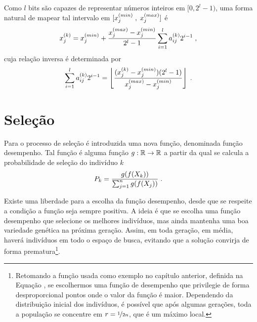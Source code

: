 Como $l$ bits são capazes de representar números inteiros em $ [0, 2^l - 1) $,
uma forma natural de mapear tal intervalo
em $ [ x^{(min)}_{j} \; , \; x^{(max)}_{j} ] $ é
\begin{equation}
  x^{(k)}_j = x^{(min)}_{j} + \frac{x^{(max)}_{j} - x^{(min)}_{j}}{2^l - 1} \sum_{i = 1}^l {a}^{(k)}_{ij} 2^{i - 1} \;\mathrm{,}
\end{equation}
cuja relação inversa é determinada por
\begin{equation}
  \sum_{i = 1}^l {a}^{(k)}_{ij} 2^{i - 1} =
  \left\lfloor \frac{({x}^{(k)}_{j} - x^{(min)}_{j})(2^l - 1)}{x^{(max)}_{j} - x^{(min)}_{j}} \right\rfloor
  \;\mathrm{.}
\end{equation}

\section{Seleção}

Para o processo de seleção é introduzida uma nova função, denominada função desempenho.
Tal função é alguma função $ g : \mathbb{R} \rightarrow \mathbb{R} $ a partir da qual se calcula a probabilidade
de seleção do indivíduo $k$
\begin{equation}
  P_k = \frac{g(f(X_k))}{\sum_{j = 1}^n g(f(X_j))} \;\mathrm{.}
\end{equation}

Existe uma liberdade para a escolha da função desempenho, desde que se respeite a condição a
função seja sempre positiva. A ideia é que se escolha uma função desempenho que
selecione os melhores indivíduos, mas ainda mantenha uma boa variedade genética na
próxima geração. Assim, em toda geração, em média, haverá indivíduos em todo o espaço
de busca, evitando que a solução convirja de forma prematura\footnote{
  Retomando a função usada como exemplo no capítulo anterior, definida na Equação
  , se escolhermos uma função de desempenho que privilegie
  de forma desproporcional pontos onde o valor da função é maior. Dependendo da
  distribuição inicial dos indivíduos, é possível que após algumas gerações,
  toda a população se concentre em $ r = \nicefrac{1}{2n} $, que é um
  máximo local.
}.

\newcommand{\fmin}{f_{min}}
\newcommand{\fmax}{f_{max}}

